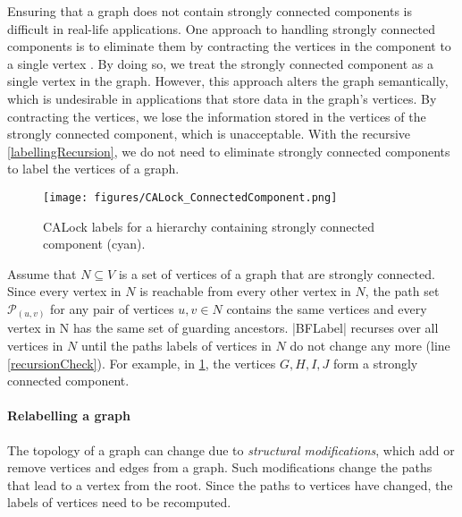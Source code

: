 Ensuring that a graph does not contain strongly connected components is difficult in real-life applications. 
One approach to handling strongly connected components is to eliminate them by contracting the vertices in the component to a single vertex \cite{sharir1981strong, tarjan1972depth, cheriyan1996algorithms,walsh2006hub}. By doing so, we treat the strongly connected component as a single vertex in the graph. 
However, this approach alters the graph semantically, which is undesirable in applications that store data in the graph's vertices. By contracting the vertices, we lose the information stored in the vertices of the strongly connected component, which is unacceptable. 
With the recursive \cref{labellingRecursion}, we do not need to eliminate strongly connected components to label the vertices of a graph. 


\begin{figure}
	\centering
	\captionsetup{justification=centering}
	\texttt{[image: figures/CALock\_ConnectedComponent.png]}
	\caption{CALock labels for a hierarchy containing strongly connected component (cyan).}
	\label{fig:stronglyConnectedComponent}
\end{figure}

Assume that $N \subseteq V$ is a set of vertices of a graph that are strongly connected. Since every vertex in $N$ is reachable from every other vertex in $N$, the path set $\mathcal{P}_{(u,v)}$ for any pair of vertices $u, v\in N$ contains the same vertices and every vertex in N has the same set of guarding ancestors. \inline|BFLabel| recurses over all vertices in $N$ until the paths labels of vertices in $N$ do not change any more (line \ref{recursionCheck}).
For example, in \cref{fig:stronglyConnectedComponent}, the vertices $G, H, I, J$ form a strongly connected component. 

\paragraph{Relabelling a graph}

The topology of a graph can change due to \emph{structural modifications}, which add or remove vertices and edges from a graph. 
Such modifications change the paths that lead to a vertex from the root.
Since the paths to vertices have changed, the labels of vertices need to be recomputed.


